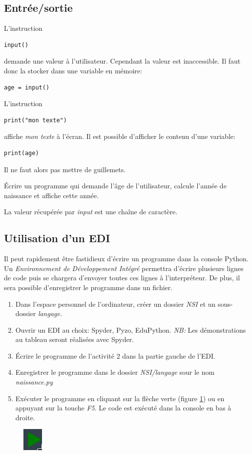 \documentclass[a4paper,11pt]{article}
\begin{document}
\begin{Form}
\subsection{Entrée/sortie}
L'instruction
\begin{lstlisting}
input()
\end{lstlisting}
demande une valeur à l'utilisateur. Cependant la valeur est inaccessible. Il faut donc la stocker dans une variable en mémoire:
\begin{lstlisting}
age = input()
\end{lstlisting}
L'instruction
\begin{lstlisting}
print("mon texte")
\end{lstlisting}
affiche \emph{mon texte} à l'écran. Il est possible d'afficher le contenu d'une variable:
\begin{lstlisting}
print(age)
\end{lstlisting}
Il ne faut alors pas mettre de guillemets.
\begin{activite}
Écrire un programme qui demande l'âge de l'utilisateur, calcule l'année de naissance et affiche cette année.
\end{activite}
\begin{commentprof}
La valeur récupérée par \emph{input} est une chaîne de caractère.
\end{commentprof}
\subsection{Utilisation d'un EDI}
Il peut rapidement être fastidieux d'écrire un programme dans la console Python. Un \emph{Environnement de Développement Intégré} permettra d'écrire plusieurs lignes de code puis se chargera d'envoyer toutes ces lignes à l'interpréteur. De plus, il sera possible d'enregistrer le programme dans un fichier.
\begin{activite}
\begin{enumerate}
\item Dans l'espace personnel de l'ordinateur, créer un dossier \emph{NSI} et un sous-dossier \emph{langage}.
\item Ouvrir un EDI au choix: Spyder, Pyzo, EduPython. \emph{NB:} Les démonstrations au tableau seront réalisées avec Spyder.
\item Écrire le programme de l'activité 2 dans la partie gauche de l'EDI.
\item Enregistrer le programme dans le dossier \emph{NSI/langage} sour le nom \emph{naissance.py}
\item Exécuter le programme en cliquant sur la flèche verte (figure \ref{execution}) ou en appuyant sur la touche \emph{F5}. Le code est exécuté dans la console en bas à droite.
\end{enumerate}
\end{activite}
\begin{figure}[!h]
\centering
\includegraphics[width=1cm]{ressources/execution.png}
\label{execution}
\end{figure}

\end{Form}
\end{document}
